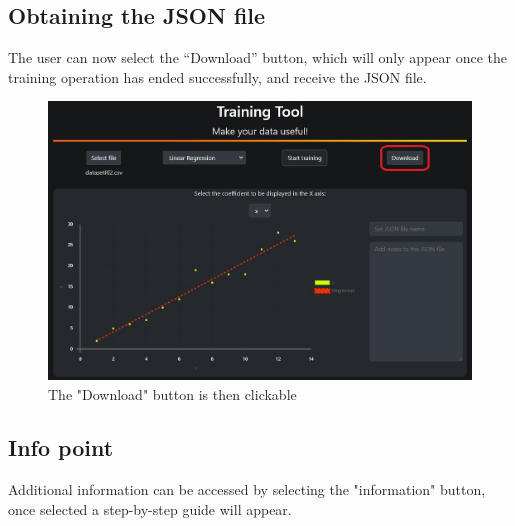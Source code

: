 \subsection{Obtaining the JSON file}
The user can now select the “Download” button, which will only appear once the training operation has ended successfully, and receive the JSON file.
\begin{figure}[H]
\centering
\includegraphics[scale=0.65]{img/tool/tool_5_1_tool.JPG}
\caption{The "Download" button is then clickable}
\end{figure} 
\newpage
\subsection{Info point}
Additional information can be accessed by selecting the "information" button, once selected a step-by-step guide will appear.

